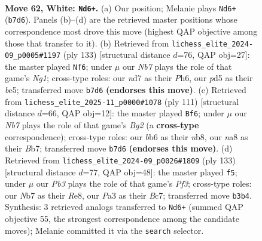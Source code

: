 \documentclass[11pt]{article}
\begin{document}
\clearpage

\begin{figure}[p]\centering
\begin{subfigure}{0.46\textwidth}\centering
\resizebox{\linewidth}{!}{%
\newchessgame
\chessboard[
  setfen={n7/1N1n1k2/1b5B/p2p1b2/8/PP2P2p/4PK2/3B4 w - - 5 62},
  showmover=false,
  pgfstyle=straightmove, color=movearrow, markmove={b7-d6}
]}
\caption{}
\end{subfigure}\hfill
\begin{subfigure}{0.46\textwidth}\centering
\resizebox{\linewidth}{!}{%
\newchessgame
\chessboard[
  setfen={6n1/5k2/4p2p/p3BP1P/1bB1p1p1/1P6/5P2/5K2 b - - 0 67},
  showmover=false,
  pgfstyle=straightmove, color=movearrow, markmove={g8-f6}
]}
\caption{}
\end{subfigure}
\\[4pt]
\begin{subfigure}{0.46\textwidth}\centering
\resizebox{\linewidth}{!}{%
\newchessgame
\chessboard[
  setfen={1N4k1/1b4b1/p3p2p/Pn2N1p1/4p3/6PP/1B3P2/5K2 b - - 20 56},
  showmover=false,
  pgfstyle=straightmove, color=movearrow, markmove={g7-f6}
]}
\caption{}
\end{subfigure}\hfill
\begin{subfigure}{0.46\textwidth}\centering
\resizebox{\linewidth}{!}{%
\newchessgame
\chessboard[
  setfen={4r3/2bb4/p4pk1/8/p2N2p1/2P1B3/1PK2P2/6R1 b - - 1 67},
  showmover=false,
  pgfstyle=straightmove, color=movearrow, markmove={f6-f5}
]}
\caption{}
\end{subfigure}
\caption{\textbf{Move 62, White: \texttt{Nd6+}.} (a) Our position; Melanie plays \texttt{Nd6+} (\texttt{b7d6}). Panels (b)--(d) are the retrieved master positions whose correspondence most drove this move (highest QAP objective among those that transfer to it). (b) Retrieved from \texttt{lichess\_elite\_2024-09\_p0005\#1197} (ply 133) [structural distance $d$=76, QAP obj=27]: the master played \texttt{Nf6}; under $\mu$ our \emph{Nb7} plays the role of that game's \emph{Ng1}; cross-type roles: our \emph{n}d7 as their \emph{P}h6, our \emph{p}d5 as their \emph{b}e5; transferred move \texttt{b7d6} \textbf{(endorses this move)}. (c) Retrieved from \texttt{lichess\_elite\_2025-11\_p0000\#1078} (ply 111) [structural distance $d$=66, QAP obj=12]: the master played \texttt{Bf6}; under $\mu$ our \emph{Nb7} plays the role of that game's \emph{Bg2} (a \textbf{cross-type} correspondence); cross-type roles: our \emph{b}b6 as their \emph{n}b8, our \emph{n}a8 as their \emph{B}b7; transferred move \texttt{b7d6} \textbf{(endorses this move)}. (d) Retrieved from \texttt{lichess\_elite\_2024-09\_p0026\#1809} (ply 133) [structural distance $d$=77, QAP obj=48]: the master played \texttt{f5}; under $\mu$ our \emph{Pb3} plays the role of that game's \emph{Pf3}; cross-type roles: our \emph{N}b7 as their \emph{R}e8, our \emph{P}a3 as their \emph{B}c7; transferred move \texttt{b3b4}. Synthesis: 3 retrieved analogs transferred to \texttt{Nd6+} (summed QAP objective 55, the strongest correspondence among the candidate moves); Melanie committed it via the \texttt{search} selector.}
\label{fig:thought-m122}
\end{figure}
\end{document}
